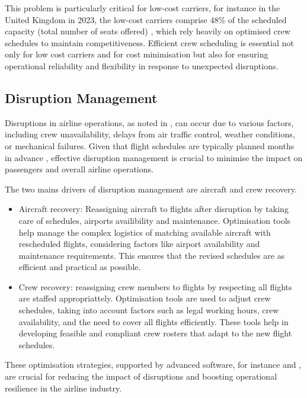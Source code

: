 This problem is particularly critical for low-cost carriers, for instance in the United Kingdom in 2023, the low-cost carriers comprise 48\% of the scheduled capacity (total number of seats offered) \cite{lcc_new_norm}, which rely heavily on optimised crew schedules to maintain competitiveness. Efficient crew scheduling is essential not only for low cost carriers and for cost minimisation but also for ensuring operational reliability and flexibility in response to unexpected disruptions.  \cite{ryanair_youtube_report}


\subsection{Disruption Management} %
\label{sub:disruption management}

Disruptions in airline operations, as noted in \cite{disruption_management}, can occur due to various factors, including crew unavailability, delays from air traffic control, weather conditions, or mechanical failures. Given that flight schedules are typically planned months in advance \cite{flight_scheduling}, effective disruption management is crucial to minimise the impact on passengers and overall airline operations.

The two mains drivers of disruption management are aircraft and crew recovery.
\begin{itemize}
    \item Aircraft recovery: Reassigning aircraft to flights after disruption by taking care of schedules, airports availibility and maintenance. Optimisation tools help manage the complex logistics of matching available aircraft with rescheduled flights, considering factors like airport availability and maintenance requirements. This ensures that the revised schedules are as efficient and practical as possible.
    \item Crew recovery: reassigning crew members to flights by respecting all flights are staffed appropriattely. Optimisation tools are used to adjust crew schedules, taking into account factors such as legal working hours, crew availability, and the need to cover all flights efficiently. These tools help in developing feasible and compliant crew rosters that adapt to the new flight schedules.
\end{itemize}

These optimisation strategies, supported by advanced software, for instance \cite{inform_software} and \cite{ibs_software}, are crucial for reducing the impact of disruptions and boosting operational resilience in the airline industry.

